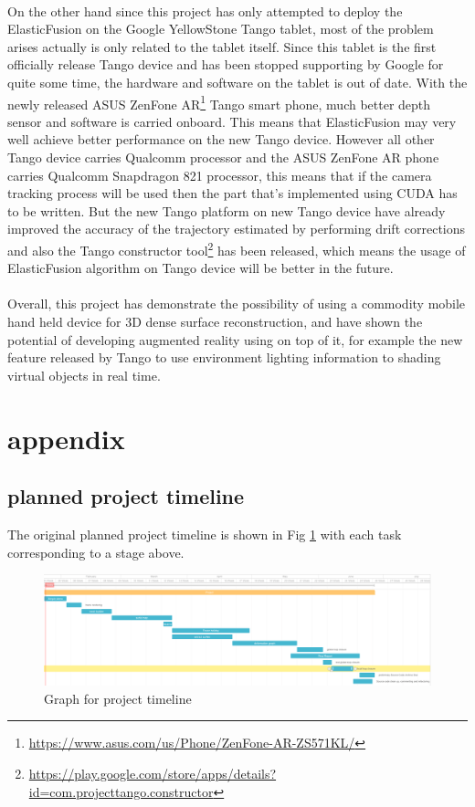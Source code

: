 \documentclass[12pt,twoside]{article}
\begin{document}
\\
On the other hand since this project has only attempted to deploy the ElasticFusion on the Google YellowStone Tango tablet, most of the problem arises actually is only related to the tablet itself. Since this tablet is the first officially release Tango device and has been stopped supporting by Google for quite some time, the hardware and software on the tablet is out of date. With the newly released ASUS ZenFone AR\footnote{\url{https://www.asus.com/us/Phone/ZenFone-AR-ZS571KL/}} Tango smart phone, much better depth sensor and software is carried onboard. This means that ElasticFusion may very well achieve better performance on the new Tango device. However all other Tango device carries Qualcomm processor and the ASUS ZenFone AR phone carries Qualcomm Snapdragon 821 processor, this means that if the camera tracking process will be used then the part that's implemented using CUDA has to be written. But the new Tango platform on new Tango device have already improved the accuracy of the trajectory estimated by performing drift corrections and also the Tango constructor tool\footnote{\url{https://play.google.com/store/apps/details?id=com.projecttango.constructor}} has been released, which means the usage of ElasticFusion algorithm on Tango device will be better in the future.\\
\\
Overall, this project has demonstrate the possibility of using a commodity mobile hand held device for 3D dense surface reconstruction, and have shown the potential of developing augmented reality using on top of it, for example the new feature released by Tango to use environment lighting information to shading virtual objects in real time.

\newpage

\section{appendix}

\subsection{planned project timeline}
The original planned project timeline is shown in Fig \ref{fig:tiemline2} with each task corresponding to a stage above.

\begin{figure}
\centering
    \includegraphics[angle=90,width=\textwidth,height=\textheight,keepaspectratio]{figures/timeline2}
   \caption{Graph for project timeline}
    \label{fig:tiemline2}
\end{figure}
\end{document}
